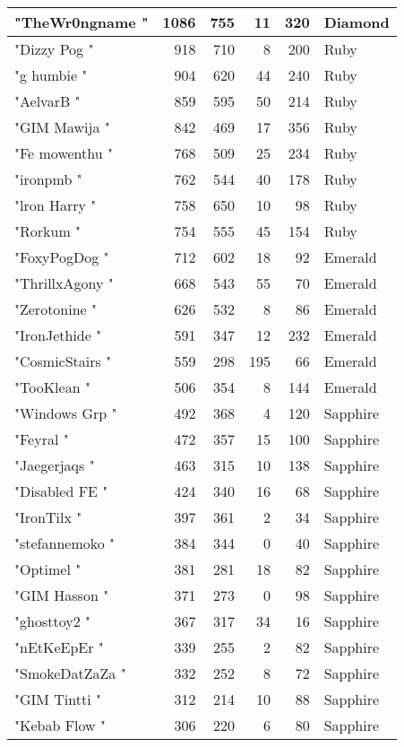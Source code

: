 \documentclass{article}
\begin{document}
\begin{table}[htbp]
\begin{tabular}{|l|r|r|r|r|l|}
"TheWr0ngname " & 1086 & 755 & 11 & 320 & Diamond \\ \hline
"Dizzy Pog " & 918 & 710 & 8 & 200 & Ruby \\ \hline
"g humbie " & 904 & 620 & 44 & 240 & Ruby \\ \hline
"AelvarB " & 859 & 595 & 50 & 214 & Ruby \\ \hline
"GIM Mawija " & 842 & 469 & 17 & 356 & Ruby \\ \hline
"Fe mowenthu " & 768 & 509 & 25 & 234 & Ruby \\ \hline
"ironpmb " & 762 & 544 & 40 & 178 & Ruby \\ \hline
"lron Harry " & 758 & 650 & 10 & 98 & Ruby \\ \hline
"Rorkum " & 754 & 555 & 45 & 154 & Ruby \\ \hline
"FoxyPogDog " & 712 & 602 & 18 & 92 & Emerald \\ \hline
"ThrillxAgony " & 668 & 543 & 55 & 70 & Emerald \\ \hline
"Zerotonine " & 626 & 532 & 8 & 86 & Emerald \\ \hline
"IronJethide " & 591 & 347 & 12 & 232 & Emerald \\ \hline
"CosmicStairs " & 559 & 298 & 195 & 66 & Emerald \\ \hline
"TooKlean " & 506 & 354 & 8 & 144 & Emerald \\ \hline
"Windows Grp " & 492 & 368 & 4 & 120 & Sapphire \\ \hline
"Feyral " & 472 & 357 & 15 & 100 & Sapphire \\ \hline
"Jaegerjaqs " & 463 & 315 & 10 & 138 & Sapphire \\ \hline
"Disabled FE " & 424 & 340 & 16 & 68 & Sapphire \\ \hline
"IronTilx " & 397 & 361 & 2 & 34 & Sapphire \\ \hline
"stefannemoko " & 384 & 344 & 0 & 40 & Sapphire \\ \hline
"Optimel " & 381 & 281 & 18 & 82 & Sapphire \\ \hline
"GIM Hasson " & 371 & 273 & 0 & 98 & Sapphire \\ \hline
"ghosttoy2 " & 367 & 317 & 34 & 16 & Sapphire \\ \hline
"nEtKeEpEr " & 339 & 255 & 2 & 82 & Sapphire \\ \hline
"SmokeDatZaZa " & 332 & 252 & 8 & 72 & Sapphire \\ \hline
"GIM Tintti " & 312 & 214 & 10 & 88 & Sapphire \\ \hline
"Kebab Flow " & 306 & 220 & 6 & 80 & Sapphire \\ \hline

\end{tabular}
\end{table}
\end{document}

